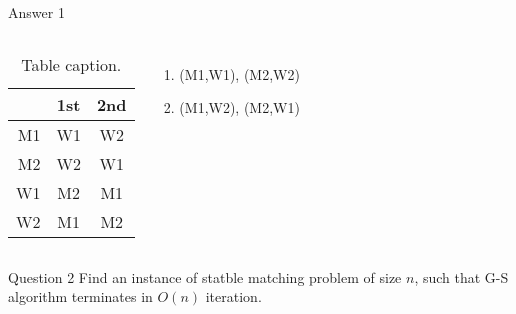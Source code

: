 \documentclass{beamer}
\begin{document}
\begin{frame}{Answer 1}
	\begin{columns}
	\begin{table}
		\centering
		\begin{tabular}{r|cc}
				 &  1st & 2nd \\\hline
			M1 & W1 & W2 \\
			M2 & W2 & W1 \\
			W1 & M2 & M1 \\
			W2 & M1 & M2 \\
		\end{tabular}
		\caption{Table caption.}
		\label{tab:demo}
	\end{table}
	\begin{enumerate}
		\item<1-> \alert{(M1,W1), (M2,W2)}
		\item<2-> (M1,W2), (M2,W1)
	\end{enumerate}
	\end{columns}
\end{frame}

\begin{frame}{Question 2}
	Find an instance of statble matching problem of size $n$, such that G-S algorithm terminates in $O(n)$ iteration.
\end{frame}
\end{document}
